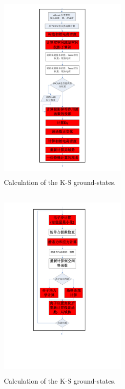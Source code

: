 \documentclass[cjk,slidestop,compress,mathserif,blue]{beamer}
\begin{document}
\frame
{
\frametitle{}
\begin{figure}[h!]
\centering
\vspace*{-0.80in}
\includegraphics[height=3.72in,width=2.5in,viewport=170 16 416 819,clip]{Figures/VASP_main_Flow-2.pdf}
\caption{\small \textrm{Calculation of the K-S ground-states.}}%
\label{VASP_Follow-2}
\end{figure}
}

\frame
{
\frametitle{}
\begin{figure}[h!]
\centering
\vspace*{-0.80in}
\includegraphics[height=3.72in,width=2.5in,viewport=146 173 436 812,clip]{Figures/VASP_main_Flow-3.pdf}
\caption{\small \textrm{Calculation of the K-S ground-states.}}%
\label{VASP_Follow-3}
\end{figure}
}
\end{document}
